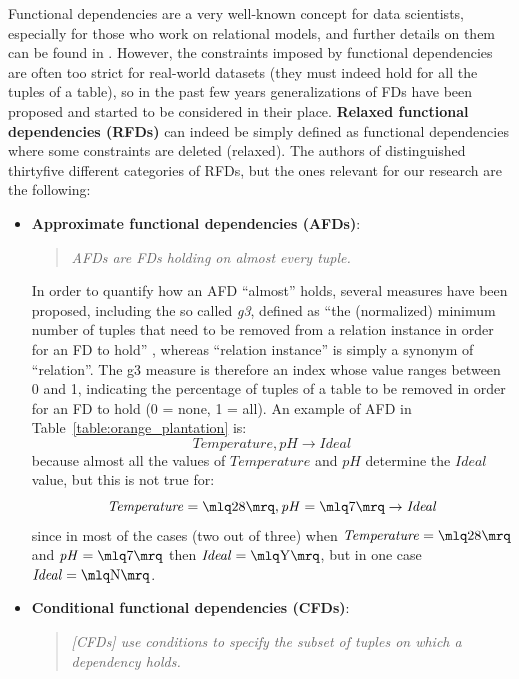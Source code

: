 Functional dependencies are a very well-known concept for data scientists, especially for those who work on relational models, and further details on them can be found in \cite{abiteboul1995foundations}.
However, the constraints imposed by functional dependencies are often too strict for real-world datasets (they must indeed hold for all the tuples of a table), so in the past few years generalizations of FDs have been proposed and started to be considered in their place. \textbf{Relaxed functional dependencies (RFDs)} can indeed be simply defined as functional dependencies where some constraints are deleted (relaxed). The authors of \cite{caruccio2015relaxed} distinguished thirtyfive different categories of RFDs, but the ones relevant for our research are the following:
\begin{itemize}
\item \textbf{Approximate functional dependencies (AFDs)}:
\begin{quote}\emph{AFDs are FDs holding on almost every tuple.} \cite[p.~151]{caruccio2015relaxed}\end{quote}
In order to quantify how an AFD ``almost'' holds, several measures have been proposed, including the so called \textit{g3}, defined as ``the (normalized) minimum number of tuples that need to be removed from a relation instance in order for an FD to hold'' \cite[p.~151]{caruccio2015relaxed}, whereas ``relation instance'' is simply a synonym of ``relation''. The g3 measure is therefore an index whose value ranges between 0 and 1, indicating the percentage of tuples of a table to be removed in order for an FD to hold (0 = none, 1 = all). An example of AFD in Table~\ref{table:orange_plantation} is: \[\mathit{Temperature}, \mathit{pH} \rightarrow \mathit{Ideal}\] because almost all the values of \(\mathit{Temperature}\) and \(\mathit{pH}\) determine the \(\mathit{Ideal}\) value, but this is not true for: \[\mathit{Temperature} = \mlq 28 \mrq, \mathit{pH} = \mlq 7 \mrq \rightarrow \mathit{Ideal}\] since in most of the cases (two out of three) when \(\mathit{Temperature} = \mlq 28 \mrq\) and \(\mathit{pH} = \mlq 7 \mrq\) then \(\mathit{Ideal} = \mlq \mathrm{Y} \mrq\), but in one case \(\mathit{Ideal} = \mlq \mathrm{N} \mrq\).
\item \textbf{Conditional functional dependencies (CFDs)}:
\begin{quote}\emph{[CFDs] use conditions to specify the subset of tuples on which a dependency holds.} \cite[p.~152]{caruccio2015relaxed}\end{quote}

\end{itemize}

